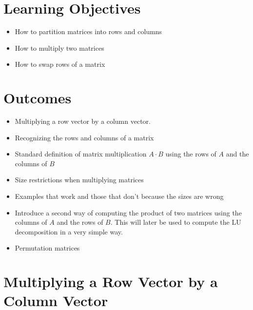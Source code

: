 \section*{Learning Objectives}

\begin{itemize}
\item How to partition matrices into rows and columns
\item How to multiply two matrices
\item How to swap rows of a matrix
\end{itemize}

\section*{Outcomes}
\begin{itemize}
\item Multiplying a row vector by a column vector.
\item Recognizing the rows and columns of a matrix
\item Standard definition of matrix multiplication $A \cdot B$ using the rows of $A$ and the columns of $B$
   \item Size restrictions when multiplying matrices
\item Examples that work and those that don't because the sizes are wrong
    \item Introduce a second way of computing the product of two matrices using the columns of $A$ and the rows of $B$. This will later be used to compute the LU decomposition in a very simple way. 
    \item Permutation matrices
\end{itemize}

\newpage


\section{Multiplying a Row Vector by a Column Vector}

